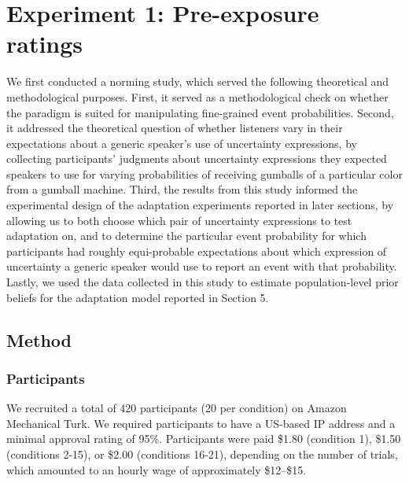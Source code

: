 \section{Experiment 1: Pre-exposure ratings}
\label{sec:exp-norming}

We first conducted a norming study, which served the following theoretical and methodological purposes.
First, it served as a methodological check on whether the paradigm is suited for 
manipulating fine-grained event probabilities. 
Second, it addressed the theoretical question of whether listeners vary in their expectations about
a generic speaker's use of uncertainty expressions, by collecting participants' judgments about 
uncertainty expressions they expected speakers to use for varying probabilities of receiving gumballs of a particular color from a gumball machine. 
Third,  the results from this study informed the experimental design of the adaptation experiments 
reported in later sections, by allowing us to both choose which pair of uncertainty expressions to test adaptation on, 
and to determine the particular event probability for which participants had roughly equi-probable expectations 
about which expression of uncertainty a generic speaker would use to report an event with that probability. 
Lastly, we used the data collected in this study to 
estimate population-level prior beliefs for the adaptation model reported in Section 5.

\subsection{Method}

\subsubsection{Participants}
We recruited a total of 420 participants 
(20 per condition) on Amazon Mechanical Turk. 
We required participants to have a US-based IP address and a minimal approval rating of 95\%.
Participants were paid \$1.80 (condition 1), \$1.50 (conditions 2-15),
or \$2.00 (conditions 16-21),
depending on the number of trials,
which amounted to an hourly wage of approximately \$12--\$15. 


